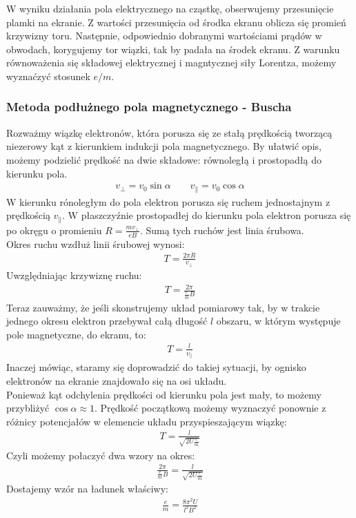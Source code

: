 \documentclass[paper=a4, fontsize=12pt]{scrartcl}
\begin{document}
W wyniku działania pola elektrycznego na cząstkę, obserwujemy przesunięcie plamki na ekranie. Z wartości przesunięcia od środka ekranu oblicza się promień krzywizny toru. Następnie, odpowiednio dobranymi wartościami prądów w obwodach, korygujemy tor wiązki, tak by padała na środek ekranu. Z warunku równoważenia się składowej elektrycznej i magntycznej siły Lorentza, możemy wyznaćzyć stosunek $e/m$.

\subsubsection{Metoda podłużnego pola magnetycznego - Buscha}
Rozważmy wiązkę elektronów, która porusza się ze stałą prędkością tworzącą niezerowy kąt z kierunkiem indukcji pola magnetycznego. By ułatwić opis, możemy podzielić prędkość na dwie składowe: równoległą  i prostopadłą do kierunku pola. \begin{align*}
v_\perp=v_0\sin\alpha\qquad v_\parallel=v_0\cos\alpha
\end{align*}  W kierunku rónoległym do pola elektron porusza się ruchem jednostajnym z prędkością $v_\parallel$. W płaszczyźnie prostopadłej do kierunku pola elektron porusza się po okręgu o promieniu $R=\frac{mv_\perp}{eB}$. Sumą tych ruchów jest linia śrubowa.\\
Okres ruchu wzdłuż linii śrubowej wynosi:
\begin{align*}
T=\frac{2\pi R}{v_\perp}
\end{align*}
Uwzględniając krzywiznę ruchu:
\begin{align*}
T=\frac{2\pi}{\frac{e}{m}B}
\end{align*}
Teraz zauważmy, że jeśli skonstrujemy układ pomiarowy tak, by w trakcie jednego okresu elektron przebywał całą długość $l$ obszaru, w którym występuje pole magnetyczne, do ekranu, to:
\begin{align*}
T=\frac{l}{v_\parallel}
\end{align*}
Inaczej mówiąc, staramy się doprowadzić do takiej sytuacji, by ognisko elektronów na ekranie znajdowało się na osi układu.\\

Ponieważ kąt odchylenia prędkości od kierunku pola jest mały, to możemy przybliżyć $\cos\alpha\approx1$. Prędkość początkową możemy wyznaczyć ponownie z różnicy potencjałów w elemencie układu przyspieszającym wiązkę:
\begin{align*}
T=\frac{l}{\sqrt{2U\frac{e}{m}}}
\end{align*}
Czyli możemy połaczyć dwa wzory na okres:
\begin{align*}
\frac{2\pi}{\frac{e}{m}B}=\frac{l}{\sqrt{2U\frac{e}{m}}}
\end{align*}
Dostajemy wzór na ładunek właściwy:
\begin{align}
\frac{e}{m}=\frac{8\pi^2U}{l^2B^2}
\end{align}
\end{document}
